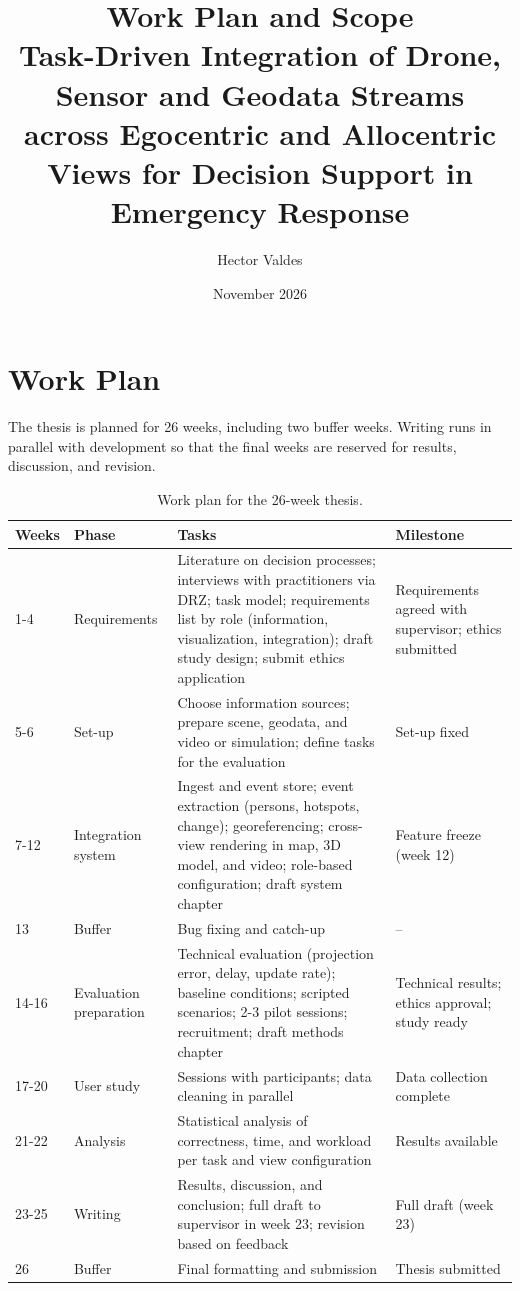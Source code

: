\documentclass{article}
\title{Work Plan and Scope\\\large Task-Driven Integration of Drone, Sensor and Geodata Streams across Egocentric and Allocentric Views for Decision Support in Emergency Response}
\author{Hector Valdes}
\date{November 2026}
\begin{document}
\maketitle

\section{Work Plan}

The thesis is planned for 26 weeks, including two buffer weeks. Writing runs in parallel with development so that the final weeks are reserved for results, discussion, and revision.

\begin{table}[h]
\centering
\small
\renewcommand{\arraystretch}{1.3}
\begin{tabularx}{\textwidth}{@{}l>{\raggedright\arraybackslash}p{2.3cm}>{\raggedright\arraybackslash}X>{\raggedright\arraybackslash}p{3.2cm}@{}}
\toprule
\textbf{Weeks} & \textbf{Phase} & \textbf{Tasks} & \textbf{Milestone} \\
\midrule
1-4 & Requirements & Literature on decision processes; interviews with practitioners via DRZ; task model; requirements list by role (information, visualization, integration); draft study design; submit ethics application & Requirements agreed with supervisor; ethics submitted \\
5-6 & Set-up & Choose information sources; prepare scene, geodata, and video or simulation; define tasks for the evaluation & Set-up fixed \\
7-12 & Integration system & Ingest and event store; event extraction (persons, hotspots, change); georeferencing; cross-view rendering in map, 3D model, and video; role-based configuration; draft system chapter & Feature freeze (week 12) \\
13 & Buffer & Bug fixing and catch-up & -- \\
14-16 & Evaluation preparation & Technical evaluation (projection error, delay, update rate); baseline conditions; scripted scenarios; 2-3 pilot sessions; recruitment; draft methods chapter & Technical results; ethics approval; study ready \\
17-20 & User study & Sessions with participants; data cleaning in parallel & Data collection complete \\
21-22 & Analysis & Statistical analysis of correctness, time, and workload per task and view configuration & Results available \\
23-25 & Writing & Results, discussion, and conclusion; full draft to supervisor in week 23; revision based on feedback & Full draft (week 23) \\
26 & Buffer & Final formatting and submission & Thesis submitted \\
\bottomrule
\end{tabularx}
\caption{Work plan for the 26-week thesis.}
\label{tab:workplan}
\end{table}
\end{document}
